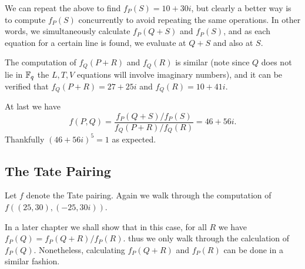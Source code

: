We can repeat the above to find $f_P(S) = 10 + 30i$, but clearly a better way
is to compute $f_P(S)$ concurrently to avoid repeating the same operations.
In other words, we simultaneously calculate $f_P(Q+S)$ and $f_P(S)$, and
as each equation for a certain line is found,
we evaluate at $Q+S$ and also at $S$.

The computation of $f_Q(P+R)$ and $f_Q(R)$ is similar (note since
$Q$ does not lie in $\mathbb{F}_q$ the $L,T,V$ equations will involve imaginary
numbers), and it can be verified that
$f_Q(P+R) = 27+25i$ and $f_Q(R)=10+41i$.

At last we have
\[
f(P,Q) = \frac{f_P(Q+S)/f_P(S)}{f_Q(P+R)/f_Q(R)} = 46+56i .
\] Thankfully $(46+56i)^5 = 1$ as expected.

\subsection {The Tate Pairing}

Let $f$ denote the Tate pairing.
Again we walk through the computation of
$f((25,30), (-25,30i))$.

In a later chapter we shall show that in this case,
for all $R$ we have $f_P(Q) = f_P(Q+R)/f_P(R)$.
thus we only walk through the calculation of
$f_P(Q)$.
Nonetheless, calculating $f_P(Q+R)$ and $f_P(R)$ can be done in
a similar fashion.

